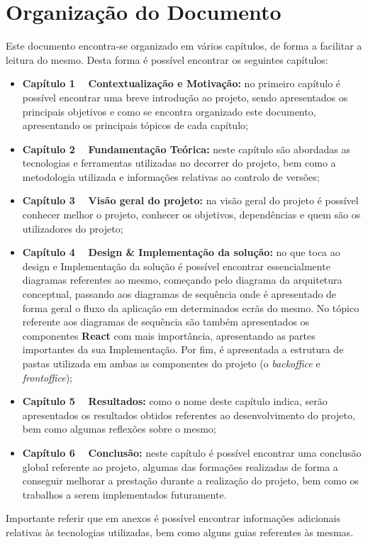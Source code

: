 \section{Organização do Documento}

Este documento encontra-se organizado em vários capítulos, de forma a facilitar a leitura do mesmo. Desta forma é possível encontrar os seguintes capítulos:

\begin{itemize}
	\item \textbf{Capítulo 1 \textemdash~ Contextualização e Motivação:} no primeiro capítulo é possível encontrar uma breve introdução ao projeto, sendo apresentados os principais objetivos e como se encontra organizado este documento, apresentando os principais tópicos de cada capítulo;

	\item \textbf{Capítulo 2 \textemdash~ Fundamentação Teórica:} neste capítulo são abordadas as tecnologias e ferramentas utilizadas no decorrer do projeto, bem como a metodologia utilizada e informações relativas ao controlo de versões;

	\item \textbf{Capítulo 3 \textemdash~ Visão geral do projeto:} na visão geral do projeto é possível conhecer melhor o projeto, conhecer os objetivos, dependências e quem são os utilizadores do projeto;

	\item \textbf{Capítulo 4 \textemdash~ Design \& Implementação da solução:} no que toca ao design e Implementação da solução é possível encontrar essencialmente diagramas referentes ao mesmo, começando pelo diagrama da arquitetura conceptual, passando aos diagramas de sequência onde é apresentado de forma geral o fluxo da aplicação em determinados ecrãs do mesmo. No tópico referente aos diagramas de sequência são também apresentados os componentes \textbf{React} com mais importância, apresentando as partes importantes da sua Implementação. Por fim, é apresentada a estrutura de pastas utilizada em ambas as componentes do projeto (o \textit{backoffice} e \textit{frontoffice});

	\item \textbf{Capítulo 5 \textemdash~ Resultados:} como o nome deste capítulo indica, serão apresentados os resultados obtidos referentes ao desenvolvimento do projeto, bem como algumas reflexões sobre o mesmo;

	\item  \textbf{Capítulo 6 \textemdash~ Conclusão:} neste capítulo é possível encontrar uma conclusão global referente ao projeto, algumas das formações realizadas de forma a conseguir melhorar a prestação durante a realização do projeto, bem como os trabalhos a serem implementados futuramente.
\end{itemize}

Importante referir que em anexos é possível encontrar informações adicionais relativas às tecnologias utilizadas, bem como alguns guias referentes às mesmas.
